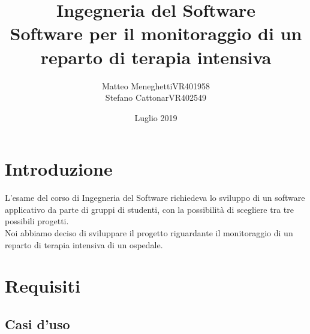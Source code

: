 \documentclass[a4paper]{report}
\title{Ingegneria del Software \\ Software  per il monitoraggio di un reparto di terapia intensiva}
\author{Matteo Meneghetti\hspace{0.2cm}VR401958 \\  Stefano Cattonar\hspace{0.2cm}VR402549}
\date{Luglio 2019}
\begin{document}
\maketitle
\tableofcontents

\chapter*{Introduzione}
    L'esame del corso di Ingegneria del Software richiedeva lo sviluppo di un software applicativo da parte di gruppi di studenti, con la possibilità di scegliere tra tre possibili progetti.\\
    Noi abbiamo deciso di sviluppare il progetto riguardante il monitoraggio di un reparto di terapia intensiva di un ospedale.
    
\chapter{Requisiti}
    \section{Casi d'uso}
\end{document}
